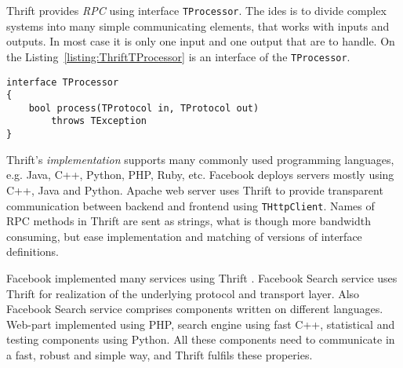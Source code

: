 Thrift provides \textit{RPC}  using interface \lstinline{TProcessor}.
The ides is to divide complex systems into many simple communicating elements, that works with inputs and outputs.
In most case it is only one input and one output that are to handle.
On the Listing~\ref{listing:ThriftTProcessor} is an interface of the \lstinline{TProcessor}.

\begin{lstlisting}[float=h, caption=Thrift's TProcessor interface., label=listing:ThriftTProcessor]
interface TProcessor
{
	bool process(TProtocol in, TProtocol out)
		throws TException
}
\end{lstlisting}


Thrift's \textit{implementation}  supports many commonly used programming languages, e.g. Java, C++, Python, PHP, Ruby, etc.
Facebook deploys servers mostly using C++, Java and Python.
Apache web server uses Thrift to provide transparent communication between backend and frontend using \lstinline{THttpClient}.
Names of RPC methods in Thrift are sent as strings, what is though more bandwidth consuming, but ease implementation and matching of versions of interface definitions.


Facebook implemented many services using Thrift .
Facebook Search service uses Thrift for realization of the underlying protocol and transport layer.
Also Facebook Search service comprises components written on different languages.
Web-part implemented using PHP, search engine using fast C++, statistical and testing components using Python.
All these components need to communicate in a fast, robust and simple way, and Thrift fulfils these properies.